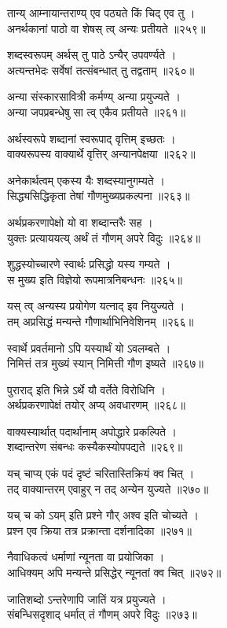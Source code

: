 तान्य् आम्नायान्तराण्य् एव पठ्यते किं चिद् एव तु ।\\अनर्थकानां पाठो वा शेषस् त्व् अन्यः प्रतीयते ॥२५९॥

शब्दस्वरूपम् अर्थस् तु पाठे ऽन्यैर् उपवर्ण्यते ।\\अत्यन्तभेदः सर्वेषां तत्संबन्धात् तु तद्वताम् ॥२६०॥

अन्या संस्कारसावित्री कर्मण्य् अन्या प्रयुज्यते ।\\अन्या जपप्रबन्धेषु सा त्व् एकैव प्रतीयते ॥२६१॥

अर्थस्वरूपे शब्दानां स्वरूपाद् वृत्तिम् इच्छतः ।\\वाक्यरूपस्य वाक्यार्थे वृत्तिर् अन्यानपेक्षया ॥२६२॥

अनेकार्थत्वम् एकस्य यैः शब्दस्यानुगम्यते ।\\सिद्ध्यसिद्धिकृता तेषां गौणमुख्यप्रकल्पना ॥२६३॥

अर्थप्रकरणापेक्षो यो वा शब्दान्तरैः सह ।\\युक्तः प्रत्याययत्य् अर्थं तं गौणम् अपरे विदुः ॥२६४॥

शुद्धस्योच्चारणे स्वार्थः प्रसिद्धो यस्य गम्यते ।\\स मुख्य इति विज्ञेयो रूपमात्रनिबन्धनः ॥२६५॥

यस् त्व् अन्यस्य प्रयोगेण यत्नाद् इव नियुज्यते ।\\तम् अप्रसिद्धं मन्यन्ते गौणार्थाभिनिवेशिनम् ॥२६६॥

स्वार्थे प्रवर्तमानो ऽपि यस्यार्थं यो ऽवलम्बते ।\\निमित्तं तत्र मुख्यं स्यान् निमित्ती गौण इष्यते ॥२६७॥

पुराराद् इति भिन्ने ऽर्थे यौ वर्तेते विरोधिनि ।\\अर्थप्रकरणापेक्षं तयोर् अप्य् अवधारणम् ॥२६८॥

वाक्यस्यार्थात् पदार्थानाम् अपोद्धारे प्रकल्पिते ।\\शब्दान्तरेण संबन्धः कस्यैकस्योपपद्यते ॥२६९॥

यच् चाप्य् एकं पदं दृष्टं चरितास्तिक्रियं क्व चित् ।\\तद् वाक्यान्तरम् एवाहुर् न तद् अन्येन युज्यते ॥२७०॥

यच् च को ऽयम् इति प्रश्ने गौर् अश्व इति चोच्यते ।\\प्रश्न एव क्रिया तत्र प्रक्रान्ता दर्शनादिका ॥२७१॥

नैवाधिकत्वं धर्माणां न्यूनता वा प्रयोजिका ।\\आधिक्यम् अपि मन्यन्ते प्रसिद्धेर् न्यूनतां क्व चित् ॥२७२॥

जातिशब्दो ऽन्तरेणापि जातिं यत्र प्रयुज्यते ।\\संबन्धिसदृशाद् धर्मात् तं गौणम् अपरे विदुः ॥२७३॥

